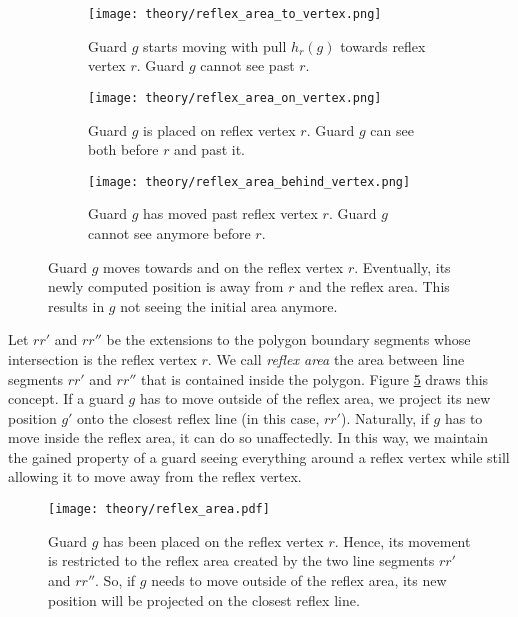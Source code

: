 \begin{figure}[h!]
    \centering
    \begin{subfigure}{0.45\textwidth}
        \texttt{[image: theory/reflex\_area\_to\_vertex.png]}
        \caption{Guard $g$ starts moving with pull $h_r(g)$ towards reflex vertex $r$. Guard $g$ cannot see past $r$.}
        \label{fig:pull_to_on_behind1}
    \end{subfigure}
    \hfill
    \begin{subfigure}{0.45\textwidth}
        \texttt{[image: theory/reflex\_area\_on\_vertex.png]}
        \caption{Guard $g$ is placed on reflex vertex $r$. Guard $g$ can see both before $r$ and past it.}
        \label{fig:pull_to_on_behind2}
    \end{subfigure}
    \begin{subfigure}{0.6\textwidth}
        \texttt{[image: theory/reflex\_area\_behind\_vertex.png]}
        \caption{Guard $g$ has moved past reflex vertex $r$. Guard $g$ cannot see anymore before $r$.}
        \label{fig:pull_to_on_behind3}
    \end{subfigure}
    \caption{Guard $g$ moves towards and on the reflex vertex $r$. Eventually, its newly computed position is away from $r$ and the reflex area. This results in $g$ not seeing the initial area anymore.}
    \label{fig:pull_to_on_behind}
\end{figure}


Let $rr'$ and $rr''$ be the extensions to the polygon boundary segments whose intersection is the reflex vertex $r$. We call \textit{reflex area} the area between line segments $rr'$ and $rr''$ that is contained inside the polygon. Figure \ref{fig:reflex_area} draws this concept. If a guard $g$ has to move outside of the reflex area, we project its new position $g'$ onto the closest reflex line (in this case, $rr'$). Naturally, if $g$ has to move inside the reflex area, it can do so unaffectedly. In this way, we maintain the gained property of a guard seeing everything around a reflex vertex while still allowing it to move away from the reflex vertex.

\begin{figure}[h!]
    \centering
    \texttt{[image: theory/reflex\_area.pdf]}
    \caption{Guard $g$ has been placed on the reflex vertex $r$. Hence, its movement is restricted to the reflex area created by the two line segments $rr'$ and $rr''$. So, if $g$ needs to move outside of the reflex area, its new position will be projected on the closest reflex line.}
    \label{fig:reflex_area}
\end{figure}

